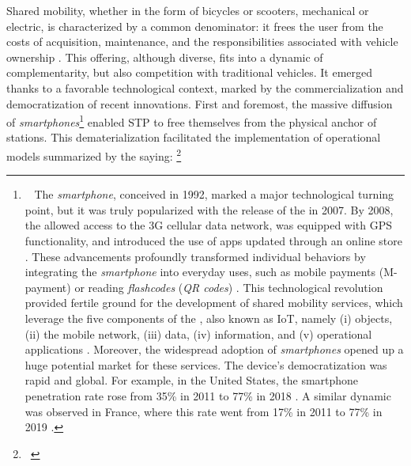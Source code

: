 \begin{refsegment}
Shared mobility, whether in the form of bicycles or scooters, mechanical or electric, is characterized by a common denominator: it frees the user from the costs of acquisition, maintenance, and the responsibilities associated with vehicle ownership \textcolor{blue}{\autocite[44]{mathew_analysis_2019}}. This offering, although diverse, fits into a dynamic of complementarity, but also competition with traditional vehicles. It emerged thanks to a favorable technological context, marked by the commercialization and democratization of recent innovations. First and foremost, the massive diffusion of \textsl{smartphones}\footnote{~
    The \textsl{smartphone}, conceived in 1992, marked a major technological turning point, but it was truly popularized with the release of the  in 2007. By 2008, the  allowed access to the 3G cellular data network, was equipped with GPS functionality, and introduced the use of apps updated through an online store \textcolor{blue}{\autocite{les_numeriques_2007_2014}}. These advancements profoundly transformed individual behaviors by integrating the \textsl{smartphone} into everyday uses, such as mobile payments (M-payment) or reading \textsl{flashcodes} (\textsl{QR codes}) \textcolor{blue}{\autocites[279]{chaix_paiement_2013}[21]{ben_jaddi_m-paiement_2018}}. This technological revolution provided fertile ground for the development of shared mobility services, which leverage the five components of the , also known as \acrfull{IoT}, namely (i) objects, (ii) the mobile network, (iii) data, (iv) information, and (v) operational applications \textcolor{blue}{\autocite{iot_evolution_world_impact_2017}}. Moreover, the widespread adoption of \textsl{smartphones} opened up a huge potential market for these services. The device's democratization was rapid and global. For example, in the United States, the smartphone penetration rate rose from 35\% in 2011 to 77\% in 2018 \textcolor{blue}{\autocite[8]{clewlow_micro-mobility_2018}}. A similar dynamic was observed in France, where this rate went from 17\% in 2011 to 77\% in 2019 \textcolor{blue}{\autocite[28]{credoc_barometre_2019}}.
} enabled \acrfull{STP} to free themselves from the physical anchor of stations. This dematerialization facilitated the implementation of operational models summarized by the saying: \footnote{~
}
\end{refsegment}
